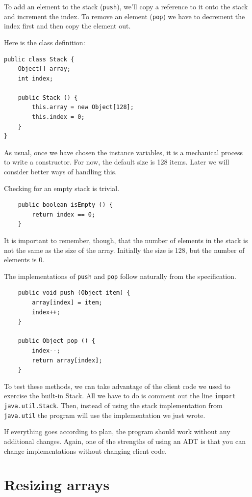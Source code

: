 \documentclass[12pt]{book}
\theoremstyle{exercise}
\begin{document}
To add an element to the stack ({\tt push}), we'll copy 
a reference to it onto the stack and increment the index.
To remove an element ({\tt pop}) we have to decrement the
index first and then copy the element out.

Here is the class definition:

\begin{verbatim}
public class Stack {
    Object[] array;
    int index;

    public Stack () {
        this.array = new Object[128];
        this.index = 0;
    }
}
\end{verbatim}
%
As usual, once we have chosen the instance variables, it is
a mechanical process to write a constructor.
For now, the default size is 128 items.  Later we will consider
better ways of handling this.

Checking for an empty stack is trivial.

\begin{verbatim}
    public boolean isEmpty () {
        return index == 0;
    }
\end{verbatim}
%
It is important to remember, though, that the number of elements in
the stack is not the same as the size of the array.  Initially the
size is 128, but the number of elements is 0.

The implementations of {\tt push} and {\tt pop} follow naturally from
the specification.

\begin{verbatim}
    public void push (Object item) {
        array[index] = item;
        index++;
    }

    public Object pop () {
        index--;
        return array[index];
    }
\end{verbatim}
%
To test these methods, we can take advantage of the client code
we used to exercise the built-in Stack.  All we have to do is
comment out the line {\tt import java.util.Stack}.  Then, instead
of using the stack implementation from {\tt java.util} the
program will use the implementation we just wrote.

If everything goes according to plan, the program should
work without any additional changes.  Again, one of the strengths
of using an ADT is that you can change implementations without
changing client code.


\section{Resizing arrays}
\label{resize}
\end{document}
